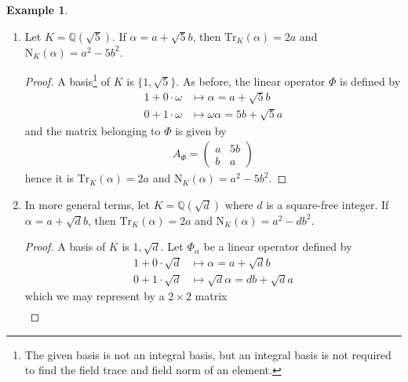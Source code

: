 \documentclass[a4paper]{book}
\theoremstyle{definition}
\newtheorem{example}{Example}[definition]
\begin{document}
\begin{example}
\begin{enumerate}
\begin{proof}
\begin{align*}
\begin{pmatrix}
                a & 2b \\
                b & a
            \end{pmatrix} \text{.}
        \end{align*}
        So we have \(\mathrm{Tr}_K(\alpha) = 2a\), \(\mathrm{N}_K(\alpha) = a^2 - 2b^2\), and \(\chi_\alpha = X^2 - 2a X + a^2 - 2b^2\).
    \end{proof}
    \item Let \(K = \mathbb{Q}(\sqrt{5})\). If \(\alpha = a + \sqrt{5}b\), then \(\mathrm{Tr}_K(\alpha) = 2a\) and \(\mathrm{N}_K(\alpha) = a^2 - 5b^2\).
    \begin{proof}
        A basis\footnote{ The given basis is not an integral basis, but an integral basis is not required to find the field trace and field norm of an element.} of \(K\) is \(\{1, \sqrt{5}\}\). As before, the linear operator \(\Phi\) is defined by
        \begin{align*}
            1 + 0 \cdot \omega &\mapsto \alpha = a + \sqrt{5} b \\
            0 + 1 \cdot \omega &\mapsto \omega \alpha = 5b + \sqrt{5}a
        \end{align*}
        and the matrix belonging to \(\Phi\) is given by
        \begin{align*}
            A_\Phi = \begin{pmatrix}
                a & 5b \\
                b & a
            \end{pmatrix}
        \end{align*}
        hence it is \(\mathrm{Tr}_K(\alpha) = 2a\) and \(\mathrm{N}_K(\alpha) = a^2 - 5b^2\).
    \end{proof}
    \item In more general terms, let \(K = \mathbb{Q}(\sqrt{d})\) where \(d\) is a square-free integer. If \(\alpha = a + \sqrt{d}b\), then \(\mathrm{Tr}_K(\alpha) = 2a\) and \(\mathrm{N}_K(\alpha) = a^2 - db^2\).
    \begin{proof}
        A basis of \(K\) is \({1, \sqrt{d}}\). Let \(\Phi_\alpha\) be a linear operator defined by
        \begin{align*}
            1 + 0 \cdot \sqrt{d} &\mapsto \alpha = a + \sqrt{d}b \\
            0 + 1 \cdot \sqrt{d} &\mapsto \sqrt{d}\alpha = db + \sqrt{d}a
        \end{align*}
        which we may represent by a \(2 \times 2\) matrix
        \begin{align*}

\end{align*}
\end{proof}
\end{enumerate}
\end{example}
\end{document}
